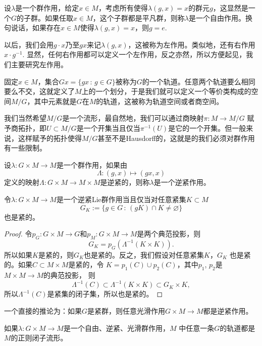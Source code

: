 \begin{para}[自由作用]
设$\lambda$是一个群作用，给定$x\in M$，考虑所有使得$\lambda(g,x)=x$的群元$g$，这显然是一个$G$的子群。如果任取$x\in M$，这个子群都是平凡群，则称$\lambda$是一个自由作用。换句说话，如果存在$x\in M$使得$\lambda(g,x)=x$，则$g=e$.
\end{para}

以后，我们会用$g\cdot x$乃至$gx$来记$\lambda(g,x)$，这被称为左作用。类似地，还有右作用$x\cdot g^{-1}$. 显然，任何右作用都可以定义一个左作用，反之亦然，所以方便起见，我们主要研究左作用。

\begin{para}[轨道空间]
	固定$x\in M$，集合$Gx=\{gx\,:\,g\in G\}$被称为$G$的一个轨道。任意两个轨道要么相同要么不交，这就定义了$M$上的一个划分，于是我们就可以定义一个等价类构成的空间$M/G$，其中元素就是$G$在$M$的轨道，这被称为轨道空间或者商空间。

	我们当然希望$M/G$是一个流形，最自然地，我们可以通过商映射$\pi:M\to M/G$
	赋予商拓扑，即$U\subset M/G$是一个开集当且仅当$\pi^{-1}(U)$是它的一个开集。但一般来说，这样赋予的拓扑使得$M/G$甚至不是Hausdorff的，这就是的我们必须对群作用有一些限制。
\end{para}

\begin{para}[逆紧作用]
	设$\lambda:G\times M\to M$是一个群作用，如果由
	\[
		\Lambda:(g,x)\mapsto (gx,x)
	\]
	定义的映射$\Lambda:G\times M\to M\times M$是逆紧的，则称$\lambda$是一个逆紧作用。
\end{para}

\begin{pro}
	令$\lambda:G\times M\to M$是一个逆紧Lie群作用当且仅当对任意紧集$K\subset M$
	\[
		G_K:=\{g\in G\,:\, (gK)\cap K\neq \varnothing\}
	\]
	也是紧的。
\end{pro}

\begin{proof}
	令$p_G:G\times M\to G$和$p_M:G\times M\to M$是两个典范投影，则
	\[
		G_K=p_G(\Lambda^{-1}(K\times K)).
	\]
	所以如果$K$是紧的，则$G_K$也是紧的。反之，我们假设对任意紧集$K$，$G_K$
	也是紧的。如果$C\subset M\times M$是紧的，令
	$K=p_1(C)\cup p_2(C)$，其中$p_1$, $p_2$是$M\times M\to M$的典范投影，
	则
	\[
		\Lambda^{-1}(C)\subset \Lambda^{-1}(K\times K)
		\subset G_K\times K,
	\]
	所以$\Lambda^{-1}(C)$是紧集的闭子集，所以也是紧的。
\end{proof}

一个直接的推论为：如果$G$是紧群，则任意光滑作用$G\times M\to M$都是逆紧作用。

\begin{lem}
	如果$\lambda:G\times M\to M$是一个自由、逆紧、光滑群作用，$M$
	中任意一条$G$的轨道都是$M$的正则闭子流形。
\end{lem}

